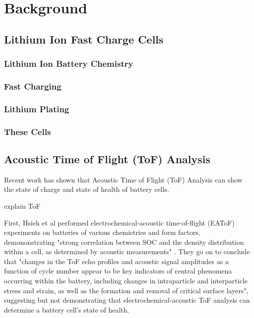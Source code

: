 \chapter{Background}

\section{Lithium Ion Fast Charge Cells}

\subsection{Lithium Ion Battery Chemistry}

\subsection{Fast Charging}

\subsection{Lithium Plating}

\subsection{These Cells}


\section{Acoustic Time of Flight (ToF) Analysis}
Recent work has shown that Acoustic Time of Flight (ToF) Analysis can show the state of charge and state of health of battery cells.

explain ToF

First, Hsieh et al  performed electrochemical-acoustic time-of-flight (EAToF) experiments on batteries of various chemistries and form factors, demononstrating "strong correlation between SOC and the density distribution within a cell, as determined by acoustic measurements" \cite{TOF-STATE}. They go on to conclude that "changes in the ToF echo profiles and acoustic signal amplitudes as a function of cycle number appear to be key indicators of central phenomena occurring within the battery, including changes in intraparticle and interparticle stress and strain, as well as the formation and removal of critical surface layers", suggesting but not demonstrating that electrochemical-acoustic ToF analysis can determine a battery cell's state of health.

